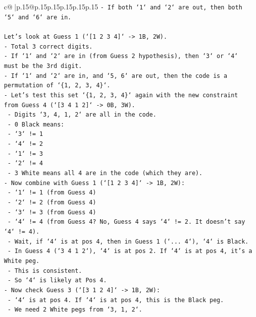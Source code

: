 \documentclass{article}
\begin{document}
{\begin{supertabular}{c@{$\;$}|p{.15\linewidth}@{}p{.15\linewidth}p{.15\linewidth}p{.15\linewidth}p{.15\linewidth}p{.15\linewidth}}
{{{\texttt{{-} If both `1` and `2` are out, then both `5` and `6` are in.} \\
\\ 
\texttt{Let's look at Guess 1 (`{[}1 2 3 4{]}` {-}> 1B, 2W).} \\
\texttt{{-} Total 3 correct digits.} \\
\texttt{{-} If `1` and `2` are in (from Guess 2 hypothesis), then `3` or `4` must be the 3rd digit.} \\
\texttt{{-} If `1` and `2` are in, and `5, 6` are out, then the code is a permutation of `\{1, 2, 3, 4\}`.} \\
\texttt{{-} Let's test this set `\{1, 2, 3, 4\}` again with the new constraint from Guess 4 (`{[}3 4 1 2{]}` {-}> 0B, 3W).} \\
\texttt{    {-} Digits `3, 4, 1, 2` are all in the code.} \\
\texttt{    {-} 0 Black means:} \\
\texttt{        {-} `3` != 1} \\
\texttt{        {-} `4` != 2} \\
\texttt{        {-} `1` != 3} \\
\texttt{        {-} `2` != 4} \\
\texttt{    {-} 3 White means all 4 are in the code (which they are).} \\
\texttt{{-} Now combine with Guess 1 (`{[}1 2 3 4{]}` {-}> 1B, 2W):} \\
\texttt{    {-} `1` != 1 (from Guess 4)} \\
\texttt{    {-} `2` != 2 (from Guess 4)} \\
\texttt{    {-} `3` != 3 (from Guess 4)} \\
\texttt{    {-} `4` != 4 (from Guess 4? No, Guess 4 says `4` != 2. It doesn't say `4` != 4).} \\
\texttt{    {-} Wait, if `4` is at pos 4, then in Guess 1 (`... 4`), `4` is Black.} \\
\texttt{    {-} In Guess 4 (`3 4 1 2`), `4` is at pos 2. If `4` is at pos 4, it's a White peg.} \\
\texttt{    {-} This is consistent.} \\
\texttt{    {-} So `4` is likely at Pos 4.} \\
\texttt{{-} Now check Guess 3 (`{[}3 1 2 4{]}` {-}> 1B, 2W):} \\
\texttt{    {-} `4` is at pos 4. If `4` is at pos 4, this is the Black peg.} \\
\texttt{    {-} We need 2 White pegs from `3, 1, 2`.} \\
}}}
\end{supertabular}}
\end{document}

